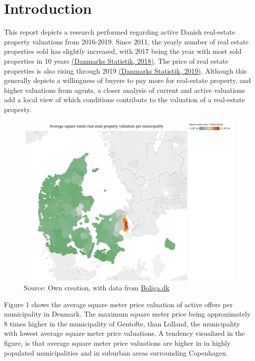 \documentclass[12pt,a4paper]{article}
\begin{document}

\newpage
\onehalfspacing

\tableofcontents
\newpage
\section{Introduction}
This report depicts a research performed regarding active Danish real-estate property valuations from 2016-2019. Since 2011, the yearly number of real estate properties sold has slightly increased, with 2017 being the year with most sold properties in 10 years \href{https://www.dst.dk/da/Statistik/nyt/NytHtml?cid=27979}{(Danmarks Statistik, 2018)}.  The price of real estate properties is also rising through 2019 \href{https://www.dst.dk/da/Statistik/nyt/NytHtml?cid=28741}{(Danmarks Statistik, 2019)}. Although this generally depicts a willingness of buyers to pay more for real-estate property, and higher valuations from agents, a closer analysis of current and active valuations add a local view of which conditions contribute to the valuation of a real-estate property. \newline
\newcommand{\source}[1]{\caption*{Source: {#1}} }\begin{figure}[H]
\centering
\caption{}
\includegraphics[scale=0.4]{123.png}
\source{Own creation, with data from \href{https://www.boliga.dk}{Boliga.dk}}
\end{figure}

Figure 1 shows the average square meter price valuation of active offers per municipality in Denmark. The maximum square meter price being approximately 8 times higher in the municipality of Gentofte, than Lolland, the municipality with lowest average square meter price valuations. A tendency visualized in the figure, is that average square meter price valuations are higher in in highly populated municipalities and in suburban areas surrounding Copenhagen. \newline
\end{document}
